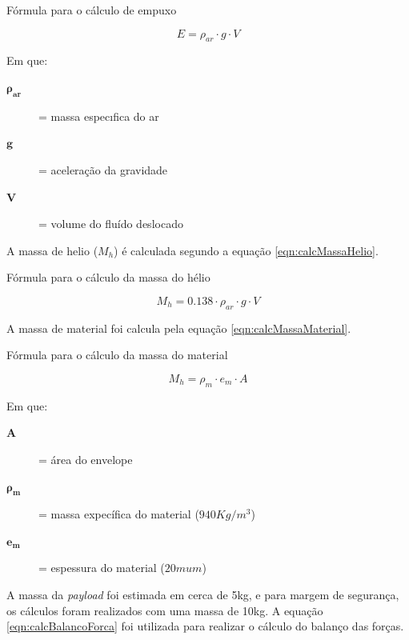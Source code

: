 	\begin{equacao}
	\caption[Fórmula para o cálculo de empuxo]{Fórmula para o cálculo de empuxo~\cite[pp.~63--65]{munson}}
		\begin{equation}
			E = \rho_{ar} \cdot g \cdot V
		\end{equation}
		\label{eqn:calcEmpuxo}
	\end{equacao}

	Em que:
	\begin{description}
		\item[$\boldsymbol{\rho_{ar}}$] = massa especıfica do ar
		\item[$\boldsymbol{g}$] = aceleração da gravidade
		\item[$\boldsymbol{V}$] = volume do fluído deslocado
	\end{description}

	A massa de helio ($M_{h}$) é calculada segundo a equação \eqref{eqn:calcMassaHelio}.

	\begin{equacao}
	\caption{Fórmula para o cálculo da massa do hélio}
		\begin{equation}
			M_{h} = 0.138 \cdot \rho_{ar} \cdot g \cdot V
		\end{equation}
		\label{eqn:calcMassaHelio}
	\end{equacao}

	A massa de material foi calcula pela equação \eqref{eqn:calcMassaMaterial}.

	\begin{equacao}
	\caption{Fórmula para o cálculo da massa do material}
		\begin{equation}
			M_{h} = \rho_{m} \cdot e_{m} \cdot A
		\end{equation}
		\label{eqn:calcMassaMaterial}
	\end{equacao}

	Em que:
	\begin{description}
		\item[$\boldsymbol{A}$] = área do envelope
		\item[$\boldsymbol{\rho_{m}}$] = massa expecífica do material ($940Kg/m^3$)
		\item[$\boldsymbol{e_{m}}$] = espessura do material ($20mu m$)
	\end{description}

	A massa da \emph{payload} foi estimada em cerca de 5kg, e para margem de segurança, os cálculos foram realizados com uma massa de 10kg. A equação \eqref{eqn:calcBalancoForca} foi utilizada para realizar o cálculo do balanço das forças.

